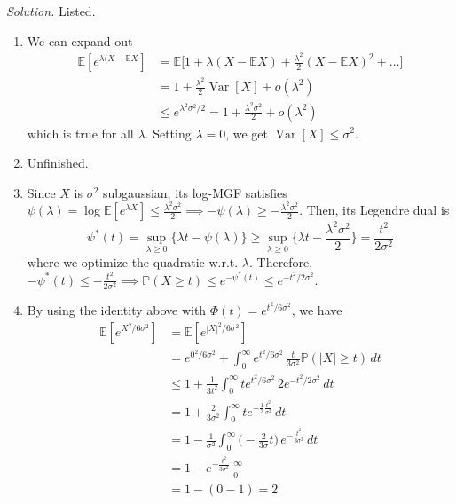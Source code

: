 \documentclass{article}
\DeclareMathOperator{\Var}{Var}
\theoremstyle{definition}
\theoremstyle{remark}
\theoremstyle{definition}
\newenvironment{solution}{\noindent \textit{Solution.}}{}
\begin{document}
\begin{solution}
Listed. 
\begin{enumerate}
    \item We can expand out 
    \begin{align*}
        \mathbb{E}[e^{\lambda (X - \mathbb{E} X}] & = \mathbb{E} \bigg[ 1 + \lambda( X - \mathbb{E}X) + \frac{\lambda^2}{2} (X - \mathbb{E} X)^2 + \ldots \bigg] \\
        & = 1 + \frac{\lambda^2}{2} \Var[X] + o(\lambda^2) \\
        & \leq e^{\lambda^2 \sigma^2 / 2} = 1 + \frac{\lambda^2 \sigma^2}{2} + o (\lambda^2)
    \end{align*}
    which is true for all $\lambda$. Setting $\lambda = 0$, we get $\Var[X] \leq \sigma^2$. 
    
    \item Unfinished. 
    
    \item Since $X$ is $\sigma^2$ subgaussian, its log-MGF satisfies $\psi(\lambda) = \log \mathbb{E}[e^{\lambda X}] \leq \frac{\lambda^2 \sigma^2}{2} \implies - \psi(\lambda) \geq - \frac{\lambda^2 \sigma^2}{2}$. Then, its Legendre dual is 
    \[\psi^\ast (t) = \sup_{\lambda \geq 0} \{ \lambda t - \psi(\lambda)\} \geq \sup_{\lambda \geq 0} \{ \lambda t - \frac{\lambda^2 \sigma^2}{2} \} = \frac{t^2}{2 \sigma^2}\]
    where we optimize the quadratic w.r.t. $\lambda$. Therefore, $-\psi^* (t) \leq - \frac{t^2}{2\sigma^2} \implies \mathbb{P}(X \geq t) \leq e^{ - \psi^* (t)} \leq e^{- t^2/ 2 \sigma^2}$. 
    
    
    \item By using the identity above with $\Phi(t) = e^{t^2 / 6 \sigma^2}$, we have 
    \begin{align*}
        \mathbb{E}[e^{X^2 / 6 \sigma^2}] & = \mathbb{E}[e^{|X|^2 / 6 \sigma^2}] \\
        & = e^{0^2 / 6 \sigma^2} + \int_0^\infty e^{t^2 / 6 \sigma^2} \, \frac{t}{3 \sigma^2} \mathbb{P}(|X| \geq t) \, dt \\
        & \leq 1 + \frac{1}{3t^2} \int_0^\infty t e^{t^2 / 6 \sigma^2} \, 2 e^{-t^2 / 2\sigma^2} \, dt\\
        & = 1 + \frac{2}{3 \sigma^2} \int_0^\infty t e^{-\frac{1}{3} \frac{t^2}{\sigma^2}} \, dt \\
        & = 1 - \frac{1}{\sigma^2} \int_0^\infty \Big( - \frac{2}{3 \sigma} t \Big) \, e^{- \frac{t^2}{3 \sigma^2}} \, dt \\
        & = 1 - e^{- \frac{t^2}{3 \sigma^2}} \bigg|_0^\infty \\
        & = 1 - (0 - 1) = 2 
    \end{align*}
    

\end{enumerate}
\end{solution}
\end{document}
